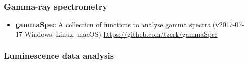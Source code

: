 \documentclass[]{article}
\providecommand{\tightlist}{%
  \setlength{\itemsep}{0pt}\setlength{\parskip}{0pt}}
\begin{document}
\hypertarget{gamma-ray-spectrometry}{%
\subsubsection{Gamma-ray spectrometry}\label{gamma-ray-spectrometry}}

\begin{itemize}
\tightlist
\item
  \textbf{gammaSpec}
  A collection of functions to analyse gamma spectra
  (v2017-07-17 \textbar{} Windows, Linux, macOS)
  \url{https://github.com/tzerk/gammaSpec}
\end{itemize}

\hypertarget{luminescence-data-analysis}{%
\subsubsection{Luminescence data analysis}\label{luminescence-data-analysis}}
\end{document}
